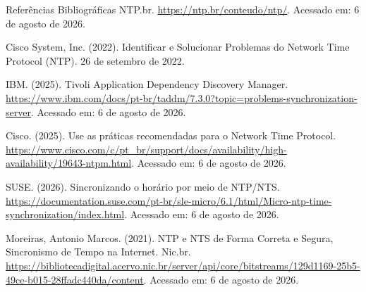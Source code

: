 \documentclass{if-beamer}
\begin{document}
	\begin{frame}{}

	\end{frame}
	\begin{frame}{}

	\end{frame}
	\begin{frame}{}

	\end{frame}
	\begin{frame}{}

	\end{frame}
	\begin{frame}{}

	\end{frame}
	\begin{frame}{}

	\end{frame}
	
	
	
	\begin{frame}[allowframebreaks]{Referências Bibliográficas}
NTP.br. \url{https://ntp.br/conteudo/ntp/}. Acessado em: 6 de agosto de 2026.

Cisco System, Inc. (2022). Identificar e Solucionar Problemas do Network Time Protocol (NTP). 26 de setembro de 2022.

IBM. (2025). Tivoli Application Dependency Discovery Manager. \url{https://www.ibm.com/docs/pt-br/taddm/7.3.0?topic=problems-synchronization-server}. Acessado em: 6 de agosto de 2026.

Cisco. (2025). Use as práticas recomendadas para o Network Time Protocol. \url{https://www.cisco.com/c/pt_br/support/docs/availability/high-availability/19643-ntpm.html}. Acessado em: 6 de agosto de 2026.

SUSE. (2026). Sincronizando o horário por meio de NTP/NTS. \url{https://documentation.suse.com/pt-br/sle-micro/6.1/html/Micro-ntp-time-synchronization/index.html}. Acessado em: 6 de agosto de 2026.

Moreiras, Antonio Marcos. (2021). NTP e NTS de Forma Correta e Segura, Sincronismo de Tempo na Internet. Nic.br. \url{https://bibliotecadigital.acervo.nic.br/server/api/core/bitstreams/129d1169-25b5-49ce-b015-28ffadc440da/content}. Acessado em: 6 de agosto de 2026.
	\end{frame}	
	
\end{document}

